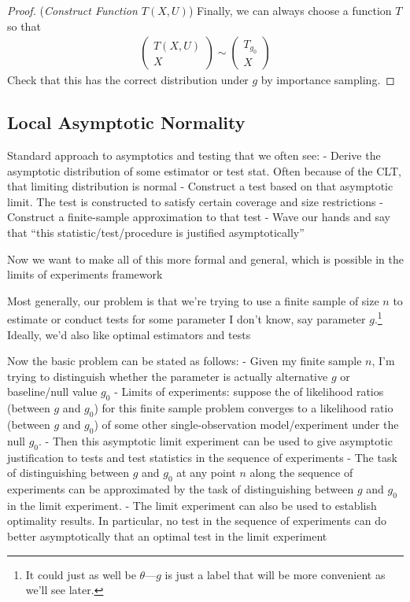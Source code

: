 \documentclass[12pt]{article}
\theoremstyle{plain}
\theoremstyle{definition}
\theoremstyle{remark}
\begin{document}
\begin{proof}
(\emph{Construct Function $T(X,U)$})
Finally, we can always choose a function $T$ so that
\begin{align*}
  \begin{pmatrix}
    T(X,U) \\ X
  \end{pmatrix}
  \sim
  \begin{pmatrix}
    T_{g_0} \\ X
  \end{pmatrix}
\end{align*}
Check that this has the correct distribution under $g$ by importance
sampling.
\end{proof}



\subsection{Local Asymptotic Normality}


Standard approach to asymptotics and testing that we often see:
- Derive the asymptotic distribution of some estimator or test stat.
  Often because of the CLT, that limiting distribution is normal
- Construct a test based on that asymptotic limit. The test is
  constructed to satisfy certain coverage and size restrictions
- Construct a finite-sample approximation to that test
- Wave our hands and say that ``this statistic/test/procedure is
  justified asymptotically''

Now we want to make all of this more formal and general, which is
possible in the limits of experiments framework

Most generally, our problem is that we're trying to use a finite sample
of size $n$ to estimate or conduct tests for some parameter I don't
know, say parameter $g$.\footnote{%
  It could just as well be $\theta$---$g$ is just a label that will be
  more convenient as we'll see later.
}
Ideally, we'd also like optimal estimators and tests

Now the basic problem can be stated as follows:
- Given my finite sample $n$, I'm trying to distinguish whether the
  parameter is actually alternative $g$ or baseline/null value $g_0$
- Limits of experiments: suppose the of likelihood ratios (between $g$
  and $g_0$) for this finite sample problem converges to a likelihood
  ratio (between $g$ and $g_0$) of some other single-observation
  model/experiment under the null $g_0$.
- Then this asymptotic limit experiment can be used to give asymptotic
  justification to tests and test statistics in the sequence of
  experiments
- The task of distinguishing between $g$ and $g_0$ at any point $n$
  along the sequence of experiments can be approximated by the task of
  distinguishing between $g$ and $g_0$ in the limit experiment.
- The limit experiment can also be used to establish optimality results.
  In particular, no test in the sequence of experiments can do better
  asymptotically that an optimal test in the limit experiment
\end{document}
